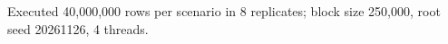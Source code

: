 Executed 40,000,000 rows per scenario in 8 replicates; block size 250,000, root seed 20261126, 4 threads.
